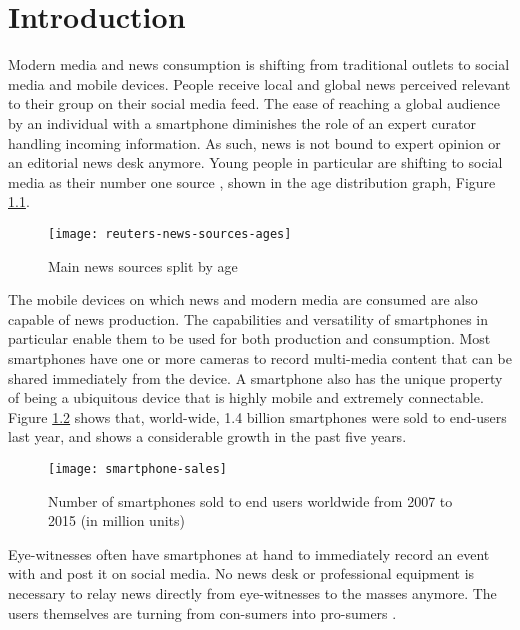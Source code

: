 \chapter{Introduction}\label{ch:intro}
Modern media and news consumption is shifting from traditional outlets to social media and mobile devices.
People receive local and global news perceived relevant to their group on their social media feed.
The ease of reaching a global audience by an individual with a smartphone diminishes the role of an expert curator handling incoming information.
As such, news is not bound to expert opinion or an editorial news desk anymore.
Young people in particular are shifting to social media as their number one source \cite{reuters_social_media}, shown in the age distribution graph, Figure \ref{fig:reuters-news-sources-ages}.
\begin{figure}[H]
	\centering
	\texttt{[image: reuters-news-sources-ages]}
	\caption{Main news sources split by age \cite{reuters_social_media}}
	\label{fig:reuters-news-sources-ages}
\end{figure}
The mobile devices on which news and modern media are consumed are also capable of news production.
The capabilities and versatility of smartphones in particular enable them to be used for both production and consumption.
Most smartphones have one or more cameras to record multi-media content that can be shared immediately from the device.
A smartphone also has the unique property of being a ubiquitous device that is highly mobile and extremely connectable.
Figure \ref{fig:smartphone-sales} shows that, world-wide, 1.4 billion smartphones were sold to end-users last year, and shows a considerable growth in the past five years.
\begin{figure}[H]
	\centering
	\texttt{[image: smartphone-sales]}
	\caption{Number of smartphones sold to end users worldwide from 2007 to 2015 (in million units) \cite{smartphone-sales}}
	\label{fig:smartphone-sales}
\end{figure}
Eye-witnesses often have smartphones at hand to immediately record an event with and post it on social media.
No news desk or professional equipment is necessary to relay news directly from eye-witnesses to the masses anymore.
The users themselves are turning from con-sumers into pro-sumers \cite{news_crowd}.

